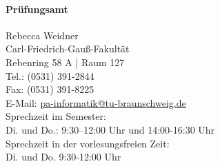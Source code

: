 	\paragraph{Prüfungsamt}
		Rebecca Weidner\\
		Carl-Friedrich-Gauß-Fakultät\\
		Rebenring 58 A | Raum 127\\
		Tel.: (0531) 391-2844\\
		Fax: (0531) 391-8225\\
		E-Mail: \url{pa-informatik@tu-braunschweig.de}\\
		Sprechzeit im Semester:\\
		Di. und Do.: 9:30–12:00 Uhr und 14:00-16:30 Uhr\\
		Sprechzeit in der vorlesungsfreien Zeit:\\
		Di. und Do. 9:30-12:00 Uhr
